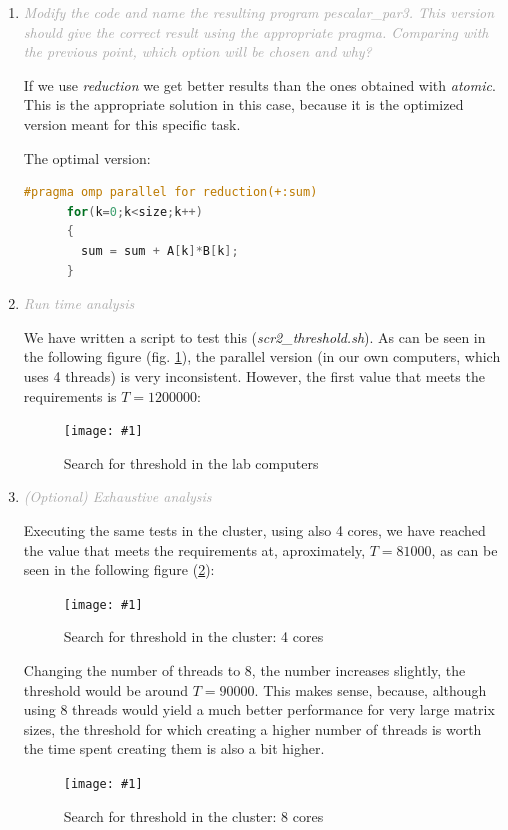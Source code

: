 \documentclass{article}
\newcommand{\myFigure}[4]{%
    \begin{figure}[!ht]
        \texttt{[image: \#1]}
        \centering
        \caption{#2}
        \label{#3}
    \end{figure}
}
\newcommand{\greyItem}[1]{\item\emph{\textcolor{darkgray}{#1}}}
\begin{document}
\begin{enumerate}[label=2.\arabic*,leftmargin=*]
\greyItem{Modify the code and name the resulting program pescalar\_par3. This version should give the correct result using the appropriate pragma. Comparing with the previous point, which option will be chosen and why?}

If we use \emph{reduction} we get better results than the ones obtained with \emph{atomic}. This is the appropriate solution in this case, because it is the optimized version meant for this specific task.

The optimal version:

\begin{lstlisting}[language=C]
    #pragma omp parallel for reduction(+:sum)
      for(k=0;k<size;k++)
      {	
        sum = sum + A[k]*B[k];
      }
\end{lstlisting}

\pagebreak

\greyItem{Run time analysis}

We have written a script to test this (\emph{scr2\_threshold.sh}). As can be seen in the following figure (fig. \ref{threshold}), the parallel version (in our own computers, which uses 4 threads) is very inconsistent. However, the first value that meets the requirements is $T=1200000$:

\myFigure{../material/outputs/out2_final/threshold0.png}{Search for threshold in the lab computers}{threshold}{.65}

\greyItem{(Optional) Exhaustive analysis}

Executing the same tests in the cluster, using also 4 cores, we have reached the value that meets the requirements at, aproximately, $T=81000$, as can be seen in the following figure (\ref{threshold_cluster4}):

\myFigure{../material/outputs/out2_final/threshold_4proc.png}{Search for threshold in the cluster: 4 cores}{threshold_cluster4}{.65}

\pagebreak

Changing the number of threads to 8, the number increases slightly, the threshold would be around $T=90000$. This makes sense, because, although using 8 threads would yield a much better performance for very large matrix sizes, the threshold for which creating a higher number of threads is worth the time spent creating them is also a bit higher.

\myFigure{../material/outputs/out2_final/threshold_8proc.png}{Search for threshold in the cluster: 8 cores}{threshold_cluster8}{.66}

\end{enumerate}
\end{document}
